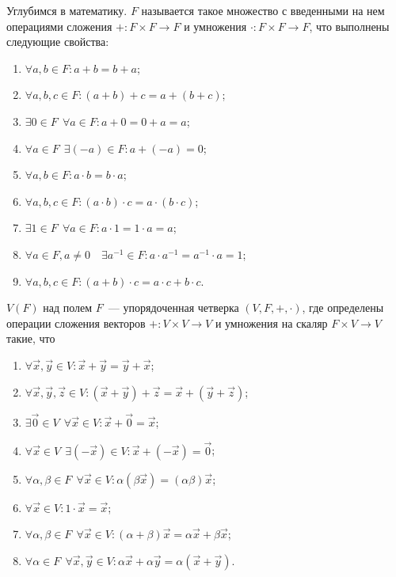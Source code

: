     Углубимся в математику.  $F$ называется такое множество с введенными на нем операциями сложения $+:F \times F  \rightarrow F$ и умножения $\cdot: F \times F \rightarrow F$, что выполнены следующие свойства:
    \begin{enumerate}
        \item  $\forall a, b \in F: a+ b = b + a$;
        \item $\forall a, b, c \in F : (a + b) + c = a + ( b + c)$;
        \item  $\exists 0 \in F~~\forall a \in F: a  + 0 = 0 + a = a$;
        \item  $\forall a \in F ~~ \exists (-a) \in F: a + (-a) = 0$;
        \item  $\forall a, b \in F: a \cdot b = b \cdot a$;
        \item  $\forall a, b, c \in F : (a \cdot b) \cdot c = a \cdot ( b \cdot c)$;
        \item $\exists 1 \in F~~\forall a \in F: a \cdot 1 = 1 \cdot a = a$;
        \item  $\forall a \in F, a \not = 0 \quad \exists a^{-1} \in F: a \cdot a^{-1} = a^{-1} \cdot a = 1$;
        \item $\forall a, b, c \in F: (a + b) \cdot c = a \cdot c + b \cdot c$.
    \end{enumerate}

     $V(F)$ над полем $F$~--- упорядоченная четверка $(V, F, + , \cdot)$, где определены операции сложения векторов $+ : V \times V \rightarrow V$ и умножения на скаляр $F \times V \rightarrow V$ такие, что
    \begin{enumerate}
        \item $\forall \vec{x}, \vec{y} \in V: \vec{x} + \vec{y} = \vec{y} + \vec{x}$;
        \item $ \forall \vec{x}, \vec{y}, \vec{z} \in V: (\vec{x} + \vec{y}) + \vec{z} =  \vec{x} + (\vec{y} + \vec{z})$;
        \item $\exists \vec{0} \in V~~\forall \vec{x} \in V: \vec{x} + \vec{0} = \vec{x}$;
        \item $\forall \vec{x} \in V~~\exists (-\vec{x}) \in V: \vec{x} + (-\vec{x}) = \vec{0}$;
        \item $\forall \alpha, \beta \in F~~\forall \vec{x} \in V: \alpha(\beta \vec{x}) =  (\alpha \beta) \vec{x}$;
        \item $\forall \vec{x} \in V: 1 \cdot \vec{x} = \vec{x}$;
        \item $\forall \alpha, \beta \in F~~\forall \vec{x} \in V: (\alpha + \beta) \vec{x} = \alpha \vec{x} + \beta \vec{x}$;
        \item $\forall \alpha \in F~~\forall \vec{x}, \vec{y} \in V: \alpha \vec{x} + \alpha \vec{y} = \alpha ( \vec{x} + \vec{y})$.
    \end{enumerate}

